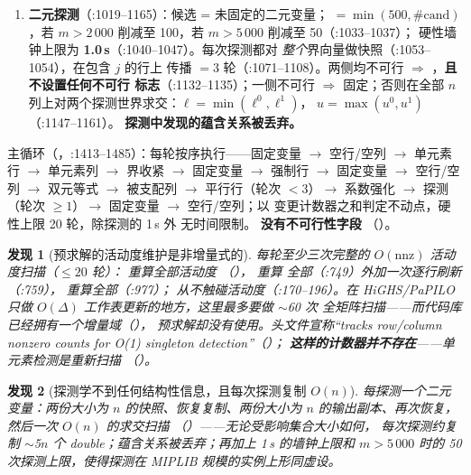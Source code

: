 \documentclass[11pt]{ctexart}
\newtheorem{finding}{发现}
\newcommand{\nnz}{\mathrm{nnz}}
\begin{document}
\begin{enumerate}[nosep]
  $a_j>0$ 的二元变量做大 $M$ 约减：
  $a_j' = u_r - \underline{\mathrm{act}}_r^{\setminus j}$，当
  $0 < a_j' < a_j - \mathrm{tol}$ 时应用，同时
  $u_r \mathrel{-}= (a_j - a_j') u_j$。没有负系数、
  一般整数或下侧变体。
\item \textbf{二元探测}（:1019--1165）：候选 = 未固定的二元变量；
  $=\min(500, \#\text{cand})$，若 $m>2\,000$
  削减至 100，若 $m>5\,000$ 削减至 50（:1033--1037）；
  硬性墙钟上限为 \textbf{1.0\,s}（:1040--1047）。每次探测都对
  \emph{整个}界向量做快照（:1053--1054），在包含 $j$ 的行上
  传播 $=3$ 轮（:1071--1108）。两侧均不可行
  $\Rightarrow$ ，\textbf{且不设置任何不可行
  标志}（:1132--1135）；一侧不可行 $\Rightarrow$ 固定；否则在全部
  $n$ 列上对两个探测世界求交：$\ell = \min(\ell^0,\ell^1)$，
  $u = \max(u^0,u^1)$（:1147--1161）。
  \textbf{探测中发现的蕴含关系被丢弃。}
\end{enumerate}

主循环（，:1413--1485）：每轮按序执行——固定变量
$\to$ 空行/空列 $\to$ 单元素行 $\to$ 单元素列 $\to$ 界收紧
$\to$ 固定变量 $\to$ 强制行 $\to$ 固定变量 $\to$ 空行/空列 $\to$
双元等式 $\to$ 被支配列 $\to$ 平行行（轮次 $<3$）$\to$ 系数强化
$\to$ 探测（轮次 $\ge 1$）$\to$ 固定变量 $\to$ 空行/空列；以
变更计数器之和判定不动点，硬性上限 20 轮，除探测的 1\,s 外
无时间限制。 \textbf{没有不可行性字段}
（）。

\begin{finding}[预求解的活动度维护是非增量式的]
\label{find:presolve-activity}
每轮至少三次完整的 $O(\nnz)$ 活动度扫描（$\le 20$ 轮）：
 重算全部活动度
（）， 重算
全部（:749）\emph{外加}一次逐行刷新（:759），
 重算全部（:977）；
 从不触碰活动度（:170--196）。在 HiGHS/PaPILO
只做 $O(\Delta)$ 工作表更新的地方，这里最多要做 $\sim$60 次
全矩阵扫描——而代码库已经拥有一个增量域（），
预求解却没有使用。头文件宣称“tracks row/column nonzero counts
for O(1) singleton detection”（）；
\textbf{这样的计数器并不存在}——单元素检测是重新扫描
（）。
\end{finding}

\begin{finding}[探测学不到任何结构性信息，且每次探测复制 $O(n)$]
每探测一个二元变量：两份大小为 $n$ 的快照、恢复复制、两份大小为
$n$ 的输出副本、再次恢复，然后一次 $O(n)$ 的求交扫描
（）——无论受影响集合大小如何，
每次探测约复制 $\sim$5$n$ 个 double；蕴含关系被丢弃；再加上
1\,s 的墙钟上限和 $m>5\,000$ 时的 50 次探测上限，使得探测在
MIPLIB 规模的实例上形同虚设。
\end{finding}
\end{document}
